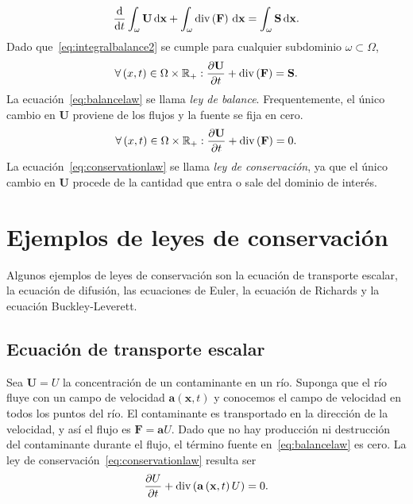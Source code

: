 \begin{equation}\label{eq:integralbalance2}
	\diff{}{t}
	\int_{\omega}
	\mathbf{U}\dl{\mathbf{x}}
	+\int_{\omega}
	\operatorname{div}
	\left(\mathbf{F}\right)
	\dl{\mathbf{x}}=
	\int_{\omega}
	\mathbf{S}\dl{\mathbf{x}}.
\end{equation}
Dado que~\eqref{eq:integralbalance2} se cumple para cualquier
subdominio $\omega\subset\Omega$,
\begin{equation}\label{eq:balancelaw}
	\forall\left(x,t\right)\in\Omega\times\mathbb{R}_{+}:
	\diffp{\mathbf{U}}{t}+
	\operatorname{\operatorname{div}
		\left(\mathbf{F}\right)}=
	\mathbf{S}.
\end{equation}
La ecuación~\eqref{eq:balancelaw} se llama \emph{ley de balance}.
Frequentemente, el único cambio en $\mathbf{U}$ proviene de los
flujos y la fuente se fija en cero.
\begin{equation}\label{eq:conservationlaw}
	\forall\left(x,t\right)\in
	\Omega\times\mathbb{R}_{+}:
	\diffp{\mathbf{U}}{t}+
	\operatorname{\operatorname{div}
		\left(\mathbf{F}\right)}=
	0.
\end{equation}
La ecuación~\eqref{eq:conservationlaw} se llama
\emph{ley de conservación}, ya que el único cambio en $\mathbf{U}$
procede de la cantidad que entra o sale del dominio de interés.

\section*{Ejemplos de leyes de conservación}

Algunos ejemplos de leyes de conservación son la ecuación de
transporte escalar, la ecuación de difusión, las ecuaciones de Euler,
la ecuación de Richards y la ecuación Buckley-Leverett.

\subsection*{Ecuación de transporte escalar}

Sea $\mathbf{U}=U$ la concentración de un contaminante en un río.
Suponga que el río fluye con un campo de velocidad
$\mathbf{a}\left(\mathbf{x},t\right)$ y conocemos el campo de
velocidad en todos los puntos del río.
El contaminante es transportado en la dirección de la velocidad, y
así el flujo es $\mathbf{F}=\mathbf{a}U$.
Dado que no hay producción ni destrucción del contaminante durante el
flujo, el término fuente en~\eqref{eq:balancelaw} es cero.
La ley de conservación~\eqref{eq:conservationlaw} resulta ser
\begin{equation}
	\diffp{U}{t}+
	\operatorname{div}
	\left(\mathbf{a}\left(\mathbf{x},t\right)U\right)=
	0.
\end{equation}

